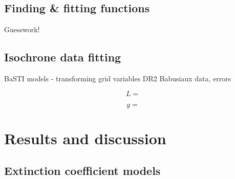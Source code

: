 \documentclass[a4paper, 11pt, oneside]{LJMU_Astro_Thesis}  %
\begin{document}
\subsection{Finding & fitting functions}
Guesswork!
\subsection{Isochrone data fitting}
BaSTI models - transforming grid variables
DR2 Babusiaux data, errors

\begin{equation}
\label{Teff_def}
L = 
\end{equation}

\begin{equation}
\label{gravity_def}
g = 
\end{equation}
\section{Results and discussion}
\subsection{Extinction coefficient models}
\end{document}

